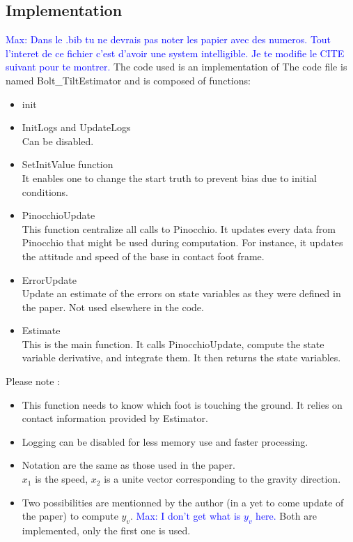 \documentclass[a4paper,10pt]{article}
\newcommand{\mnaveau}[1]{\textcolor{blue}{Max: #1}}
\begin{document}
\subsection{Implementation}
\mnaveau{Dans le .bib tu ne devrais pas noter les papier avec des numeros. Tout l'interet de ce fichier c'est d'avoir une system intelligible. Je te modifie le CITE suivant pour te montrer.}
The code used is an implementation of \cite{Benallegue_2020}
The code file is named Bolt\_TiltEstimator and is composed of functions:
\begin{itemize}
	\item{init}
	\item{InitLogs and UpdateLogs\\Can be disabled.}
	\item{SetInitValue function\\ It enables one to change the start truth to prevent bias due to initial conditions.}
	\item{PinocchioUpdate\\This function centralize all calls to Pinocchio. It updates every data from Pinocchio that might be used during computation. For instance, it updates the attitude and speed of the base in contact foot frame.}
	\item{ErrorUpdate\\ Update an estimate of the errors on state variables as they were defined in the paper. Not used elsewhere in the code.}
	\item{Estimate\\This is the main function. It calls PinocchioUpdate, compute the state variable derivative, and integrate them. It then returns the state variables.}
\end{itemize}

Please note :\\

\begin{itemize}[noitemsep,topsep=0.5pt,parsep=0.1pt,partopsep=0.1pt]
	\item{This function needs to know which foot is touching the ground. It relies on contact information provided by Estimator.}
	\item{Logging can be disabled for less memory use and faster processing.}
	\item{Notation are the same as those used in the paper.\\ $x_1$ is the speed, $x_2$ is a unite vector corresponding to the gravity direction.}
	\item{Two possibilities are mentionned by the author (in a yet to come update of the paper) to compute $y_v$. \mnaveau{I don't get what is $y_v$ here.} Both are implemented, only the first one is used.}
	
\end{itemize}
\end{document}
